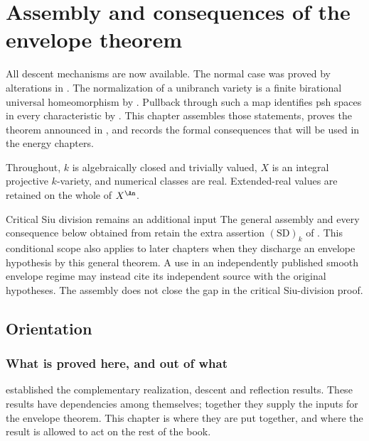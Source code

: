 \chapter{Assembly and consequences of the envelope theorem}
\label{chap:bj-envelope-consequences}

All descent mechanisms are now available.
The normal case was proved by alterations in
.
The normalization of a unibranch variety is a finite birational universal
homeomorphism by .
Pullback through such a map identifies psh spaces in every characteristic by
.
This chapter assembles those statements, proves the theorem announced in
, and records the formal consequences
that will be used in the energy chapters.

Throughout, $k$ is algebraically closed and trivially valued,
$X$ is an integral projective $k$-variety, and numerical classes are real.
Extended-real values are retained on the whole of $X^{\An}$.

\begin{warning}{Critical Siu division remains an additional input}
\label{warn:ch45-siu-dependency}
The general assembly and every consequence below obtained from
 retain the extra assertion $\mathrm{(SD)}_k$
of . This conditional scope also applies
to later chapters when they discharge an envelope hypothesis by this general
theorem. A use in an independently published smooth envelope regime may
instead cite its independent source with the original hypotheses.
The assembly does not close the gap in the critical Siu-division proof.
\end{warning}

\section{Orientation}
\label{sec:ch45-orientation}

\subsection{What is proved here, and out of what}
\label{sec:ch45-what}

established the complementary realization, descent and reflection results.
These results have dependencies among themselves; together they supply the
inputs for the envelope theorem.  This chapter is where they are put together, and where
the result is allowed to act on the rest of the book.

